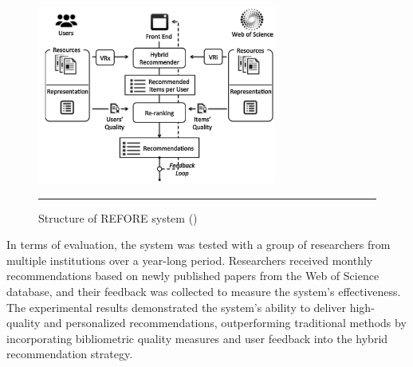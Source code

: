 \begin{figure}[htbp]
    \centering
 \includegraphics[width=0.7\textwidth]{figures/literature-review/refore.png}
     \rule{35em}{0.5pt}
    \caption{Structure of REFORE system (\textcite{refore})}
 \label{fig:refore}
\end{figure}

In terms of evaluation, the system was tested with a group of researchers from multiple institutions over a year-long period.
Researchers received monthly recommendations based on newly published papers from the Web of Science database, and their feedback was collected to measure the system's effectiveness.
The experimental results demonstrated the system's ability to deliver high-quality and personalized recommendations, outperforming traditional methods by incorporating bibliometric quality measures and user feedback into the hybrid recommendation strategy.

